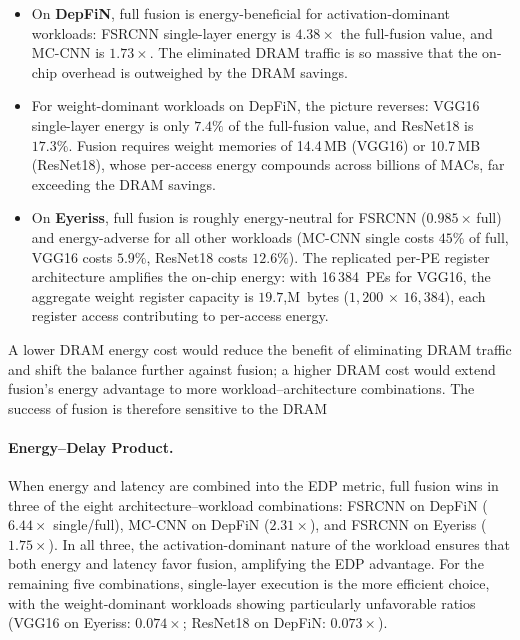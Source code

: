 \begin{itemize}
  \item On \textbf{DepFiN}, full fusion is energy-beneficial for
        activation-dominant workloads: FSRCNN single-layer energy is
        $4.38\times$ the full-fusion value, and MC-CNN is
        $1.73\times$.
        The eliminated DRAM traffic is so massive that the on-chip overhead is
        outweighed by the DRAM savings.
  \item For weight-dominant workloads on DepFiN, the picture
        reverses: VGG16 single-layer energy is only $7.4\%$ of the
        full-fusion value, and ResNet18 is $17.3\%$.
        Fusion requires weight memories of 14.4\,MB (VGG16) or
        10.7\,MB (ResNet18), whose per-access energy compounds
        across billions of MACs, far exceeding the DRAM savings.
  \item On \textbf{Eyeriss}, full fusion is roughly energy-neutral
        for FSRCNN ($0.985\times$\,full) and energy-adverse for all
        other workloads (MC-CNN single costs $45\%$ of full, VGG16
        costs $5.9\%$, ResNet18 costs $12.6\%$).
        The replicated per-PE register architecture amplifies the
        on-chip energy: with 16\,384~PEs for VGG16, the aggregate
        weight register capacity is $19.7$,M~bytes ($1{,}200$ $\times$ $16{,}384$), each register access contributing to
        per-access energy.
\end{itemize}

\noindent
A lower DRAM energy cost would reduce the benefit of eliminating
DRAM traffic and shift the balance further against fusion; a higher
DRAM cost would extend fusion's energy advantage to more
workload--architecture combinations.
The success of fusion is therefore sensitive to the DRAM

\paragraph{Energy--Delay Product.}
When energy and latency are combined into the EDP metric, full
fusion wins in three of the eight architecture--workload
combinations: FSRCNN on DepFiN ($6.44\times$ single/full), MC-CNN
on DepFiN ($2.31\times$), and FSRCNN on Eyeriss ($1.75\times$).
In all three, the activation-dominant nature of the workload
ensures that both energy and latency favor fusion, amplifying the
EDP advantage.
For the remaining five combinations, single-layer execution is the
more efficient choice, with the weight-dominant workloads showing
particularly unfavorable ratios (VGG16 on Eyeriss:
$0.074\times$; ResNet18 on DepFiN: $0.073\times$).

